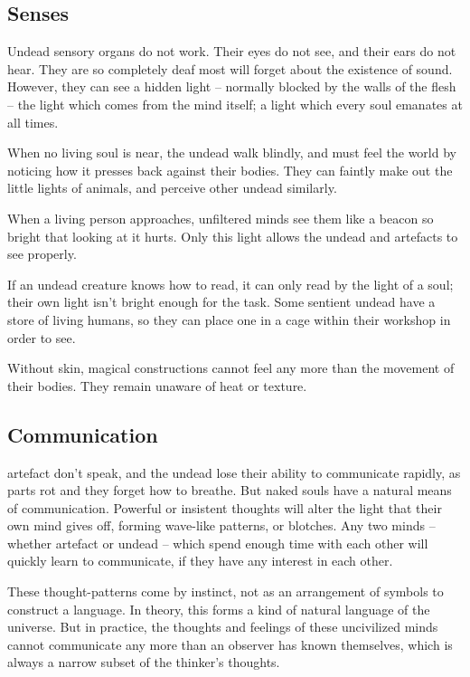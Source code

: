 \begin{multicols}{2}
\renewcomand\npcsymbol{\D}

\subsection[The undead are deaf and blind, but see by the light of living souls]{Senses}
\label{undead_senses}
\label{artefact_senses}

Undead sensory organs do not work.
Their eyes do not see, and their ears do not hear.
They are so completely deaf most will forget about the existence of sound.
However, they can see a hidden light -- normally blocked by the walls of the flesh -- the light which comes from the mind itself; a light which every soul emanates at all times.

When no living soul is near, the undead walk blindly, and must feel the world by noticing how it presses back against their bodies.
They can faintly make out the little lights of animals, and perceive other undead similarly.

When a living person approaches, unfiltered minds see them like a beacon so bright that looking at it hurts.
Only this light allows the undead and \glspl{artefact} to see properly.

If an undead creature knows how to read, it can only read by the light of a soul; their own light isn't bright enough for the task.
Some sentient undead have a store of living humans, so they can place one in a cage within their workshop in order to see.

Without skin, magical constructions cannot feel any more than the movement of their bodies.
They remain unaware of heat or texture.

\subsection{Communication}
\label{dead_communication}

\Gls{artefact} don't speak, and the undead lose their ability to communicate rapidly, as parts rot and they forget how to breathe.
But naked souls have a natural means of communication.
Powerful or insistent thoughts will alter the light that their own mind gives off, forming wave-like patterns, or blotches.
Any two minds -- whether \gls{artefact} or undead -- which spend enough time with each other will quickly learn to communicate, if they have any interest in each other.

These thought-patterns come by instinct, not as an arrangement of symbols to construct a language.
In theory, this forms a kind of natural language of the universe.
But in practice, the thoughts and feelings of these uncivilized minds cannot communicate any more than an observer has known themselves, which is always a narrow subset of the thinker's thoughts.

\end{multicols}

